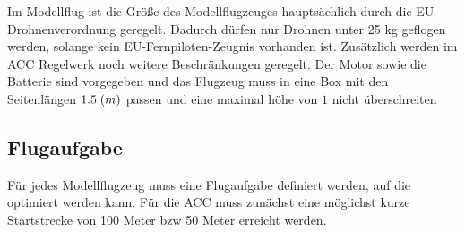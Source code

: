 Im Modellflug ist die Größe des Modellflugzeuges hauptsächlich durch die EU-Drohnenverordnung geregelt. Dadurch dürfen nur Drohnen unter 25 kg geflogen werden, solange kein EU-Fernpiloten-Zeugnis vorhanden ist. Zusätzlich werden im ACC Regelwerk noch weitere Beschränkungen geregelt. Der Motor sowie die Batterie sind vorgegeben und das Flugzeug muss in eine Box mit den Seitenlängen $1.5\;\text(m)$ passen und eine maximal höhe von $1$ nicht überschreiten


\subsection{Flugaufgabe}

Für jedes Modellflugzeug muss eine Flugaufgabe definiert werden, auf die optimiert werden kann. Für die ACC muss zunächst eine möglichst kurze Startstrecke von 100 Meter bzw 50 Meter erreicht werden.